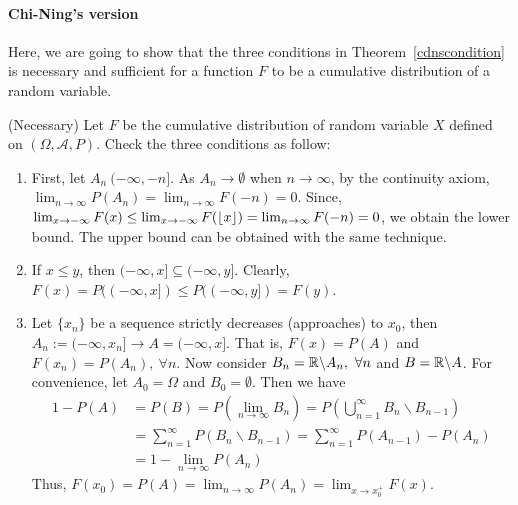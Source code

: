 \documentclass[../Probability_Theory.tex]{subfiles}
\begin{document}
\paragraph{\color{red} Chi-Ning's version}
Here, we are going to show that the three conditions in Theorem~\ref{cdnscondition} is necessary and sufficient for a function $F$ to be a cumulative distribution of a random variable.

(Necessary)
Let $F$ be the cumulative distribution of random variable $X$ defined on $(\Omega,\mathcal{A},P)$. Check the three conditions as follow:
\begin{enumerate}
	\item First, let $A_n \ (-\infty,-n]$. As $A_n\rightarrow\emptyset$ when $n\rightarrow\infty$, by the continuity axiom, $\lim_{n\rightarrow\infty}P(A_n) = \lim_{n\rightarrow\infty}F(-n)=0$. Since, $\lim_{x\rightarrow-\infty}F(x)\leq\lim_{x\rightarrow-\infty}F(\floor*{x})=\lim_{n\rightarrow\infty}F(-n)=0$, we obtain the lower bound. The upper bound can be obtained with the same technique.
	\item If $x\leq y$, then $(-\infty,x]\subseteq(-\infty,y]$. Clearly, $F(x) = P((-\infty,x])\leq P((-\infty,y])=F(y)$.
	\item Let $\{x_n\}$ be a sequence strictly decreases (approaches) to $x_0$, then $A_n:=(-\infty,x_n]\rightarrow A = (-\infty,x]$. That is, $F(x) = P(A)$ and $F(x_n) = P(A_n),\ \forall n$. Now consider $B_n=\R\backslash A_n,\ \forall n$ and $B=\R\backslash A$. For convenience, let $A_0 = \Omega$ and $B_0 = \emptyset$. Then we have
	\begin{align*}
	1-P(A) &= P(B) = P(\lim_{n\rightarrow\infty}B_n) = P(\bigcup_{n=1}^{\infty}B_n\backslash B_{n-1})\\
	&=\sum_{n=1}^{\infty} P(B_n\backslash B_{n-1}) = \sum_{n=1}^{\infty} P(A_{n-1}) - P(A_n)\\
	& = 1-\lim_{n\rightarrow\infty}P(A_n)
	\end{align*}
	Thus, $F(x_0) = P(A) = \lim_{n\rightarrow\infty}P(A_n) = \lim_{x\rightarrow x_0^+}F(x)$.
\end{enumerate}
\end{document}
